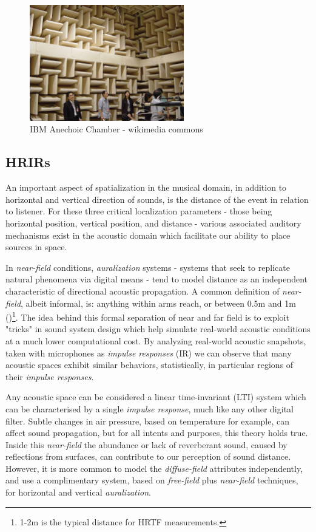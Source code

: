 \begin{figure}[ht!]%
\centering
\includegraphics[width=0.6\textwidth]{img/ibm-anechoic.jpg} 
\caption{IBM Anechoic Chamber - wikimedia commons}
\label{fig:ibm-anechoic}
\end{figure}

\subsection{HRIRs}\label{subsec:hrirs}

An important aspect of spatialization in the musical domain, in addition to horizontal and vertical direction of sounds, is the distance of the event in relation to listener. For these three critical localization parameters - those being horizontal position, vertical position, and distance - various associated auditory mechanisms exist in the acoustic domain which facilitate our ability to place sources in space. 

In \textit{near-field} conditions, \textit{auralization} systems - systems that seek to replicate natural phenomena via digital means - tend to model distance as an independent characteristic of directional acoustic propagation. A common definition of \textit{near-field}, albeit informal, is: anything within arms reach, or between 0.5m and 1m (\cite{Betbeder.2017})\footnote{1-2m is the typical distance for HRTF measurements.}. The idea behind this formal separation of near and far field is to exploit "tricks" in sound system design which help simulate real-world acoustic conditions at a much lower computational cost. By analyzing real-world acoustic snapshots, taken with microphones as \textit{impulse responses} (IR) we can observe that many acoustic spaces exhibit similar behaviors, statistically, in particular regions of their \textit{impulse responses}. 

Any acoustic space can be considered a linear time-invariant (LTI) system which can be characterised by a single \textit{impulse response}, much like any other digital filter. Subtle changes in air pressure, based on temperature for example, can affect sound propagation, but for all intents and purposes, this theory holds true. Inside this \textit{near-field} the abundance or lack of reverberant sound, caused by reflections from surfaces, can contribute to our perception of sound distance. However, it is more common to model the \textit{diffuse-field} attributes independently, and use a complimentary system, based on \textit{free-field} plus \textit{near-field} techniques, for horizontal and vertical \textit{auralization}.

